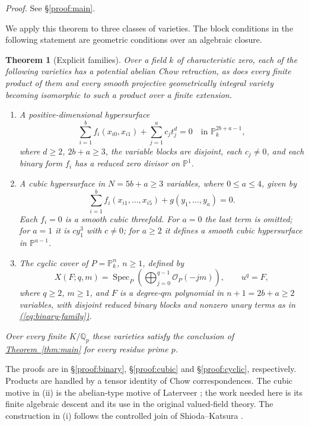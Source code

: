 \documentclass[11pt,a4paper]{article}
\newtheorem{theorem}{Theorem}[section]
\theoremstyle{definition}
\theoremstyle{remark}\newtheorem{remark}[theorem]{Remark}
\numberwithin{equation}{section}
\newcommand{\Q}{\mathbb Q}\newcommand{\R}{\mathbb R}\newcommand{\C}{\mathbb C}
\newcommand{\PP}{\mathbb P}\newcommand{\LL}{\mathbb L}
\newcommand{\Spec}{\operatorname{Spec}}\newcommand{\Bl}{\operatorname{Bl}}
\newcommand{\subref}[1]{\hyperref[#1]{\textcolor{sectionlink}{\S\ref*{#1}}}}
\newcommand{\thmref}[1]{\hyperref[#1]{\textcolor{resultlink}{Theorem~\ref*{#1}}}}
\renewcommand{\eqref}[1]{\hyperref[#1]{\textcolor{equationlink}{(\ref*{#1})}}}
\newcommand{\proofloc}[1]{\emph{Proof.} See \subref{#1}.}
\begin{document}
\proofloc{proof:main}

We apply this theorem to three classes of varieties. The block conditions in
the following statement are geometric conditions over an algebraic closure.

\begin{theorem}[Explicit families]\label{thm:families}
Over a field $k$ of characteristic zero, each of the following varieties
has a potential abelian Chow retraction, as does every finite product of
them and every smooth projective geometrically integral variety becoming
isomorphic to such a product over a finite extension.
\begin{enumerate}[label=\textup{(\roman*)}]
\item A positive-dimensional hypersurface
\begin{equation}\label{eq:binary-family}
 \sum_{i=1}^{b}f_i(x_{i0},x_{i1})+\sum_{j=1}^{a}c_jt_j^d=0
 \quad\text{in }\PP^{2b+a-1}_k,
\end{equation}
where $d\ge2$, $2b+a\ge3$, the variable blocks are disjoint, each
$c_j\ne0$, and each binary form $f_i$ has a reduced zero divisor on $\PP^1$.
\item A cubic hypersurface in $N=5b+a\ge3$ variables, where
$0\le a\le4$, given by
\begin{equation}\label{eq:cubic-family}
       \sum_{i=1}^{b}f_i(x_{i1},\ldots,x_{i5})+g(y_1,\ldots,y_a)=0.
\end{equation}
Each $f_i=0$ is a smooth cubic threefold. For $a=0$ the last term is
omitted; for $a=1$ it is $cy_1^3$ with $c\ne0$; for $a\ge2$ it defines a smooth
cubic hypersurface in $\PP^{a-1}$.
\item The cyclic cover of $P=\PP^n_k$, $n\ge1$, defined by
\begin{equation}\label{eq:cyclic-family}
 X(F;q,m)=\Spec_P\left(\bigoplus_{j=0}^{q-1}\mathcal O_P(-jm)\right),
 \qquad u^q=F,
\end{equation}
where $q\ge2$, $m\ge1$, and $F$ is a degree-$qm$ polynomial in
$n+1=2b+a\ge2$ variables, with disjoint reduced binary blocks and
nonzero unary terms as in \eqref{eq:binary-family}.
\end{enumerate}
Over every finite $K/\Q_p$ these varieties satisfy the
conclusion of \thmref{thm:main} for every residue prime $p$.
\end{theorem}

The proofs are in \subref{proof:binary}, \subref{proof:cubic} and
\subref{proof:cyclic}, respectively. Products are handled by a tensor
identity of Chow correspondences. The cubic motive in (ii) is the
abelian-type motive of Laterveer \cite[Theorem 5]{Laterveer}; the work
needed here is its finite algebraic descent and its use in the original
valued-field theory. The construction in (i) follows the controlled join
of Shioda--Katsura \cite[Remark 1.10]{SK}.
\end{document}
